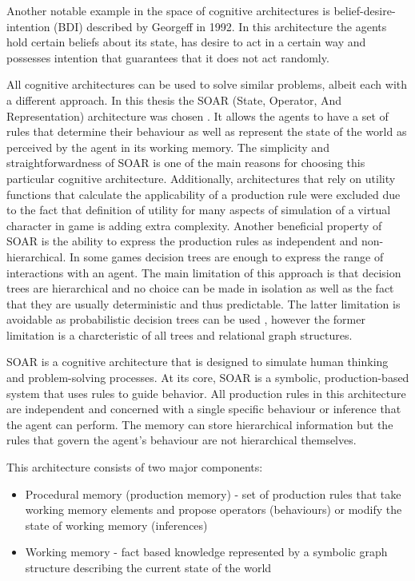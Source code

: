 Another notable example in the space of cognitive architectures is belief-desire-intention (BDI) described by Georgeff in 1992\cite{georgeff1992abstract}.
In this architecture the agents hold certain beliefs about its state, has desire to act in a certain way and possesses intention that guarantees that it does not act randomly.

All cognitive architectures can be used to solve similar problems, albeit each with a different approach.
In this thesis the SOAR (State, Operator, And Representation) architecture was chosen \cite{laird2019soar}.
It allows the agents to have a set of rules that determine their behaviour as well as represent the state of the world as perceived by the agent in its working memory.
The simplicity and straightforwardness of SOAR is one of the main reasons for choosing this particular cognitive architecture.
Additionally, architectures that rely on utility functions that calculate the applicability of a production rule were excluded due to the fact that definition of utility for many aspects of simulation of a virtual character in game is adding extra complexity.
Another beneficial property of SOAR is the ability to express the production rules as independent and non-hierarchical.
In some games decision trees are enough to express the range of interactions with an agent\cite{sweetser2002current}.
The main limitation of this approach is that decision trees are hierarchical and no choice can be made in isolation as well as the fact that they are usually deterministic and thus predictable.
The latter limitation is avoidable as probabilistic decision trees can be used \cite{saks1986probabilistic}, however the former limitation is a charcteristic of all trees and relational graph structures.

SOAR is a cognitive architecture that is designed to simulate human thinking and problem-solving processes.
At its core, SOAR is a symbolic, production-based system that uses rules to guide behavior.
All production rules in this architecture are independent and concerned with a single specific behaviour or inference that the agent can perform.
The memory can store hierarchical information but the rules that govern the agent's behaviour are not hierarchical themselves.

This architecture consists of two major components:

\begin{itemize}
    \item Procedural memory (production memory) - set of production rules that take working memory elements and propose operators (behaviours) or modify the state of working memory (inferences)
    \item Working memory - fact based knowledge represented by a symbolic graph structure describing the current state of the world
\end{itemize}

